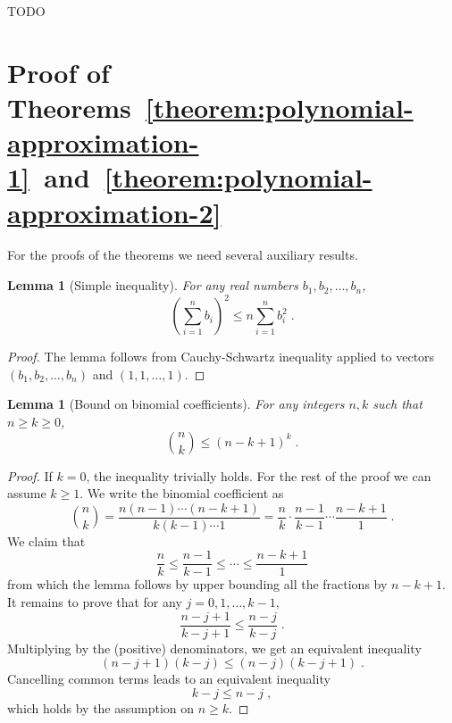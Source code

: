 \documentclass[12pt]{article}
\newtheorem{lemma}[definition]{Lemma}
\begin{document}
TODO

\section{Proof of Theorems~\ref{theorem:polynomial-approximation-1}~and~\ref{theorem:polynomial-approximation-2}}
\label{section:proof-of-polynomial-approximation}

For the proofs of the theorems we need several auxiliary results.

\begin{lemma}[Simple inequality]
\label{lemma:simple-inequality}
For any real numbers $b_1, b_2, \dots, b_n$,
$$
\left( \sum_{i=1}^n b_i \right)^2 \le n \sum_{i=1}^n b_i^2 \; .
$$
\end{lemma}

\begin{proof}
The lemma follows from Cauchy-Schwartz inequality applied to
vectors $(b_1, b_2, \dots, b_n)$ and $(1,1,\dots,1)$.
\end{proof}

\begin{lemma}[Bound on binomial coefficients]
\label{lemma:binomial-bound}
For any integers $n,k$ such that $n \ge k \ge 0$,
$$
\binom{n}{k} \le (n - k + 1)^k \; .
$$
\end{lemma}

\begin{proof}
If $k = 0$, the inequality trivially holds. For the rest of the proof we can
assume $k \ge 1$. We write the binomial coefficient as
$$
\binom{n}{k}
= \frac{n(n-1)\cdots(n-k+1)}{k(k-1) \cdots 1}
= \frac{n}{k} \cdot \frac{n-1}{k - 1} \cdots \frac{n-k+1}{1} \; .
$$
We claim that
$$
\frac{n}{k} \le \frac{n-1}{k - 1} \le \cdots \le \frac{n-k+1}{1}
$$
from which the lemma follows by upper bounding all the fractions by $n-k+1$.
It remains to prove that for any $j=0,1,\dots,k-1$,
$$
\frac{n - j + 1}{k - j + 1} \le \frac{n - j}{k - j} \; .
$$
Multiplying by the (positive) denominators, we get an equivalent inequality
$$
(n - j + 1)(k - j) \le (n - j)(k - j + 1) \; .
$$
Cancelling common terms leads to an equivalent inequality
$$
k - j \le n - j \; ,
$$
which holds by the assumption on $n \ge k$.
\end{proof}
\end{document}
